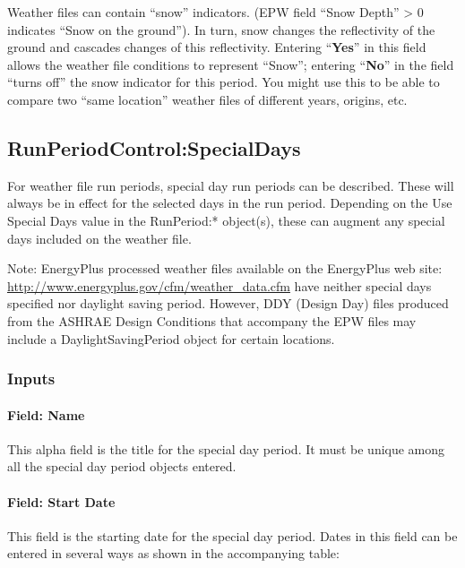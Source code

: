 Weather files can contain ``snow'' indicators. (EPW field ``Snow Depth'' \textgreater{} 0 indicates ``Snow on the ground''). In turn, snow changes the reflectivity of the ground and cascades changes of this reflectivity. Entering ``\textbf{Yes}'' in this field allows the weather file conditions to represent ``Snow''; entering ``\textbf{No}'' in the field ``turns off'' the snow indicator for this period. You might use this to be able to compare two ``same location'' weather files of different years, origins, etc.

\subsection{RunPeriodControl:SpecialDays}\label{runperiodcontrolspecialdays}

For weather file run periods, special day run periods can be described. These will always be in effect for the selected days in the run period. Depending on the Use Special Days value in the RunPeriod:* object(s), these can augment any special days included on the weather file.

\begin{callout}
Note: EnergyPlus processed weather files available on the EnergyPlus web site: \url{http://www.energyplus.gov/cfm/weather\_data.cfm} have neither special days specified nor daylight saving period. However, DDY (Design Day) files produced from the ASHRAE Design Conditions that accompany the EPW files may include a DaylightSavingPeriod object for certain locations.
\end{callout}

\subsubsection{Inputs}\label{inputs-6-013}

\paragraph{Field: Name}\label{field-name-6-010}

This alpha field is the title for the special day period. It must be unique among all the special day period objects entered.

\paragraph{Field: Start Date}\label{field-start-date}

This field is the starting date for the special day period. Dates in this field can be entered in several ways as shown in the accompanying table:

